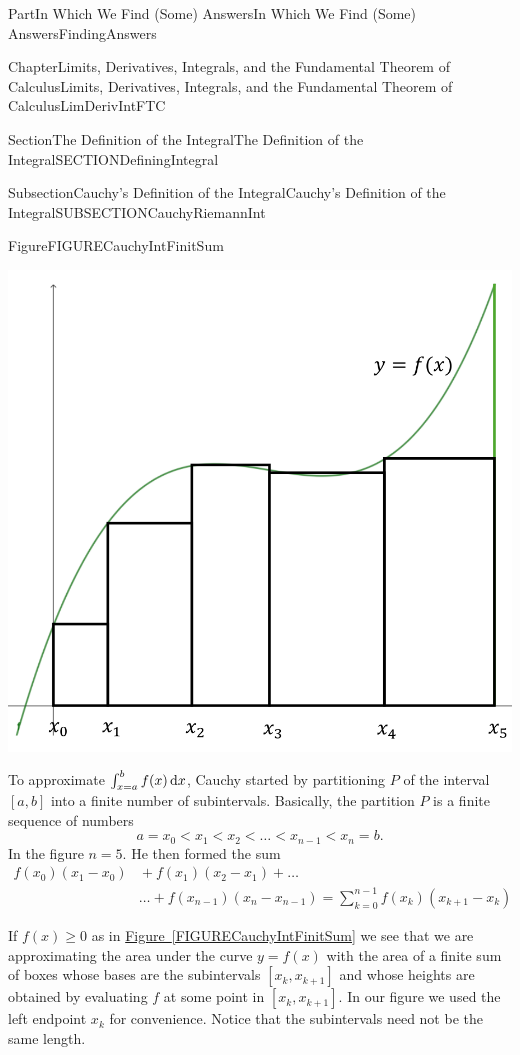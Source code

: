\documentclass[oneside,10pt,]{book}
\newcommand{\xreffont}{\relax}
\numberwithin{equation}{part}
\newcommand{\dx}[1]{\,{\rm d}#1}
\newcommand{\lt}{<}
\newcommand{\amp}{&}
\begin{document}
\begin{partptx}{Part}{In Which We Find (Some) Answers}{}{In Which We Find (Some) Answers}{}{}{FindingAnswers}
\begin{chapterptx}{Chapter}{Limits, Derivatives, Integrals, and the Fundamental Theorem of Calculus}{}{Limits, Derivatives, Integrals, and the Fundamental Theorem of Calculus}{}{}{LimDerivIntFTC}
\begin{sectionptx}{Section}{The Definition of the Integral}{}{The Definition of the Integral}{}{}{SECTIONDefiningIntegral}
\begin{subsectionptx}{Subsection}{Cauchy's Definition of the Integral}{}{Cauchy's Definition of the Integral}{}{}{SUBSECTIONCauchyRiemannInt}
\begin{figureptx}{Figure}{}{FIGURECauchyIntFinitSum}{}
\begin{image}{0.275}{0.45}{0.275}{}
\includegraphics[width=\linewidth]{external/images/Integration2.png}
\end{image}%
\tcblower
\end{figureptx}%
To approximate \(\int^b_{x=a}{f(x)\dx{x}}\), Cauchy started by partitioning \(P\) of the interval\([a,b]\) into a finite number of subintervals.  Basically, the partition \(P\) is a finite sequence of numbers%
\begin{equation*}
a=x_0\lt x_1\lt x_2\lt\dots \lt x_{n-1}\lt x_n=b \text{.}
\end{equation*}
In the figure \(n=5\). He then formed the sum%
\begin{align*}
f\left(x_0\right)\left(x_1-x_0\right)\amp{}+f\left(x_1\right)\left(x_2-x_1\right)+\dots\\
\amp{}\dots
+f\left(x_{n-1}\right)\left(x_n-x_{n-1}\right)=\sum^{n-1}_{k=0}{f(x_k)(x_{k+1}-x_k)}
\end{align*}
%
\par
If \(f\left(x\right)\ge 0\) as in \hyperref[FIGURECauchyIntFinitSum]{Figure~{\xreffont\ref{FIGURECauchyIntFinitSum}}} we see that we are approximating the area under the curve \(y=f(x)\) with the area of a finite sum of boxes whose bases are the subintervals \([x_k,x_{k+1}]\) and whose heights are obtained by evaluating \(f\) at some point in \([x_k,x_{k+1}]\). In our figure we used the left endpoint \(x_k\) for convenience.       Notice that the subintervals need not be the same length.%

\end{subsectionptx}
\end{sectionptx}
\end{chapterptx}
\end{partptx}
\end{document}
